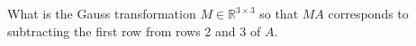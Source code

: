 \documentclass[12pt, leqno]{article}
\begin{document}

What is the Gauss transformation $M \in \mathbb{R}^{3 \times 3}$ so that
$MA$ corresponds to subtracting the first row from rows 2 and 3 of $A$.
\end{document}
